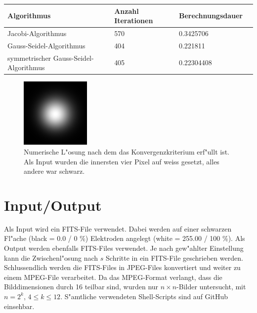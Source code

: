 \begin{refsection}
\begin{center}
\begin{tabular}{ | l | l | l | p{5cm} |}
\hline
\textbf{Algorithmus} & \textbf{Anzahl Iterationen} & \textbf{Berechnungsdauer} \\ \hline
Jacobi-Algorithmus & 570 & 0.3425706 \\ \hline
Gauss-Seidel-Algorithmus & 404 & 0.221811 \\ \hline
symmetrischer Gauss-Seidel-Algorithmus & 405 & 0.22304408\\
\hline
\end{tabular}
\end{center}

\begin{figure}
\centering 
\includegraphics[width=0.6\hsize]{potential/images/konvergenz/konvergenz.jpg}
\caption{Numerische L"osung nach dem das Konvergenzkriterium erf"ullt ist.
Als Input wurden die innersten vier Pixel auf weiss gesetzt, alles andere war
schwarz.}
\label{konvergenz}
\end{figure}

\section{Input/Output}
Als Input wird ein FITS-File verwendet. Dabei werden auf einer schwarzen
Fl"ache (black = 0.0 / 0 \%) Elektroden angelegt (white = 255.00 /
100 \%). Als Output werden ebenfalls FITS-Files verwendet. Je nach
gew"ahlter Einstellung kann die Zwischenl"osung nach $s$ Schritte in
ein FITS-File geschrieben werden. Schlussendlich werden die FITS-Files
in JPEG-Files konvertiert und weiter zu einem MPEG-File verarbeitet. Da
das MPEG-Format verlangt, dass die Bilddimensionen durch 16 teilbar sind,
wurden nur $n\times n$-Bilder untersucht, mit $n = 2^k$, $4\le k\le
12$. S"amtliche verwendeten Shell-Scripts sind auf GitHub einsehbar. 


\end{refsection}
